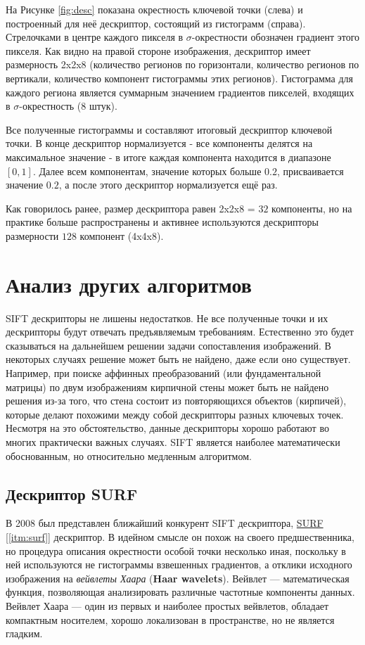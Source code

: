 На Рисунке \ref{fig:desc} показана окрестность ключевой точки (слева) и построенный для неё дескриптор, состоящий из гистограмм (справа). Стрелочками в центре каждого пикселя в $\sigma$-окрестности обозначен градиент этого пикселя. Как видно на правой стороне изображения, дескриптор имеет размерность 2x2x8 (количество регионов по горизонтали, количество регионов по вертикали, количество компонент гистограммы этих регионов). Гистограмма для каждого региона является суммарным значением градиентов пикселей, входящих в $\sigma$-окрестность ($8$ штук).

Все полученные гистограммы и составляют итоговый дескриптор ключевой точки. В конце дескриптор нормализуется - все компоненты делятся на максимальное значение - в итоге каждая компонента находится в диапазоне $[0,1]$. Далее всем компонентам, значение которых больше $0.2$, присваивается значение $0.2$, а после этого дескриптор нормализуется ещё раз.

Как говорилось ранее, размер дескриптора равен 2x2x8 = $32$ компоненты, но на практике больше распространены и активнее используются дескрипторы размерности $128$ компонент (4x4x8).

\section{Анализ других алгоритмов}

SIFT дескрипторы не лишены недостатков. Не все полученные точки и их дескрипторы будут отвечать предъявляемым требованиям. Естественно это будет сказываться на дальнейшем решении задачи сопоставления изображений. В некоторых случаях решение может быть не найдено, даже если оно существует. Например, при поиске аффинных преобразований (или фундаментальной матрицы) по двум изображениям кирпичной стены может быть не найдено решения из-за того, что стена состоит из повторяющихся объектов (кирпичей), которые делают похожими между собой дескрипторы разных ключевых точек. Несмотря на это обстоятельство, данные дескрипторы хорошо работают во многих практически важных случаях. SIFT является наиболее математически обоснованным, но относительно медленным алгоритмом.

\subsection{Дескриптор SURF}

В 2008 был представлен ближайший конкурент SIFT дескриптора, \hyperref[itm:surf]{ SURF [\ref{itm:surf}]} дескриптор. В идейном смысле он похож на своего предшественника, но процедура описания окрестности особой точки несколько иная, поскольку в ней используются не гистограммы взвешенных градиентов, а отклики исходного изображения на \textit{вейвлеты Хаара} (\textbf{Haar wavelets}). Вейвлет — математическая функция, позволяющая анализировать различные частотные компоненты данных. Вейвлет Хаара — один из первых и наиболее простых вейвлетов, обладает компактным носителем, хорошо локализован в пространстве, но не является гладким. 

